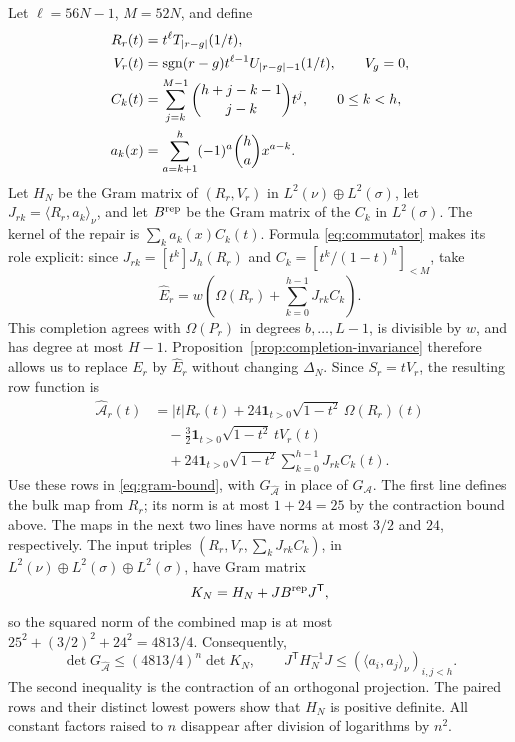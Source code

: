 Let $\ell=56N-1$, $M=52N$, and define
\begin{align*}
 R_r(t)&=t^\ell T_{|r-g|}(1/t),\\
 V_r(t)&=\operatorname{sgn}(r-g)t^{\ell-1}U_{|r-g|-1}(1/t),\qquad V_g=0,\\
 C_k(t)&=\sum_{j=k}^{M-1}\binom{h+j-k-1}{j-k}t^j,\qquad 0\le k<h,\\
 a_k(x)&=\sum_{a=k+1}^h(-1)^a\binom ha x^{a-k}.
\end{align*}
Let $H_N$ be the Gram matrix of $(R_r,V_r)$ in
$L^2(\nu)\oplus L^2(\sigma)$, let $J_{rk}=\langle R_r,a_k\rangle_\nu$,
and let $B^{\rm rep}$ be the Gram matrix of the $C_k$ in $L^2(\sigma)$.
The kernel of the repair is $\sum_k a_k(x)C_k(t)$. Formula
\eqref{eq:commutator} makes its role explicit: since
$J_{rk}=[t^k]J_h(R_r)$ and
$C_k=[t^k/(1-t)^h]_{<M}$, take
\[
 \widehat E_r=w\left(\Omega(R_r)+\sum_{k=0}^{h-1}J_{rk}C_k\right).
\]
This completion agrees with $\Omega(P_r)$ in degrees $b,\ldots,L-1$,
is divisible by $w$, and has degree at most $H-1$.
Proposition~\ref{prop:completion-invariance} therefore allows us to
replace $E_r$ by $\widehat E_r$ without changing $\Delta_N$.
Since $S_r=tV_r$, the resulting row function is
\begin{align*}
 \widehat{\mathcal A}_r(t)
 &=|t|R_r(t)+24\mathbf1_{t>0}\sqrt{1-t^2}\,\Omega(R_r)(t)\\
 &\quad-\tfrac32\mathbf1_{t>0}\sqrt{1-t^2}\,tV_r(t)\\
 &\quad+24\mathbf1_{t>0}\sqrt{1-t^2}
                    \sum_{k=0}^{h-1}J_{rk}C_k(t).
\end{align*}
Use these rows in \eqref{eq:gram-bound}, with
$G_{\widehat{\mathcal A}}$ in place of $G_{\mathcal A}$.
The first line defines the bulk map from $R_r$; its norm is at most
$1+24=25$ by the contraction bound above. The maps in the next two
lines have norms at most $3/2$ and $24$, respectively.
The input triples $(R_r,V_r,\sum_kJ_{rk}C_k)$, in
$L^2(\nu)\oplus L^2(\sigma)\oplus L^2(\sigma)$, have Gram matrix
\[
 K_N=H_N+JB^{\rm rep}J^{\mathsf T},
\]
so the squared norm of the combined map is at most
$25^2+(3/2)^2+24^2=4813/4$. Consequently,
\begin{equation}\label{eq:row-repair-reduction}
 \det G_{\widehat{\mathcal A}}\le(4813/4)^n\det K_N,
 \qquad J^{\mathsf T}H_N^{-1}J\le
             (\langle a_i,a_j\rangle_\nu)_{i,j<h}.
\end{equation}
The second inequality is the contraction of an orthogonal projection.
The paired rows and their distinct lowest powers show that $H_N$ is
positive definite. All constant factors raised to $n$ disappear after
division of logarithms by $n^2$.

